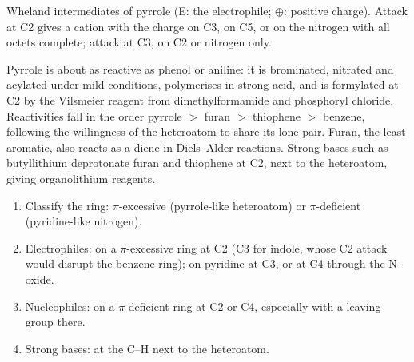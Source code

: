 \begin{omfigure}

{\small Wheland intermediates of pyrrole (E: the electrophile; $\oplus$: positive charge).
Attack at C2 gives a cation with the charge on C3, on C5, or on the nitrogen with all
octets complete; attack at C3, on C2 or nitrogen only.}
\end{omfigure}

Pyrrole is about as reactive as phenol or aniline: it is brominated, nitrated
and acylated under mild conditions, polymerises in strong acid, and is
formylated at C2 by the Vilsmeier reagent from dimethylformamide and phosphoryl
chloride. Reactivities fall in the order pyrrole $>$ furan $>$ thiophene $>$ benzene,
following the willingness of the heteroatom to share its lone pair. Furan,
the least aromatic, also reacts as a diene in Diels--Alder reactions. Strong
bases such as butyllithium deprotonate furan and thiophene at C2, next to the
heteroatom, giving organolithium reagents.

\begin{method}\label{met:b3:heterocycles:site}
\begin{enumerate}
  \item Classify the ring: $\pi$-excessive (pyrrole-like heteroatom) or $\pi$-deficient
        (pyridine-like nitrogen).
  \item Electrophiles: on a $\pi$-excessive ring at C2 (C3 for indole, whose C2 attack
        would disrupt the benzene ring); on pyridine at C3, or at C4 through the
        N-oxide.
  \item Nucleophiles: on a $\pi$-deficient ring at C2 or C4, especially with a leaving
        group there.
  \item Strong bases: at the C--H next to the heteroatom.
\end{enumerate}
\end{method}

